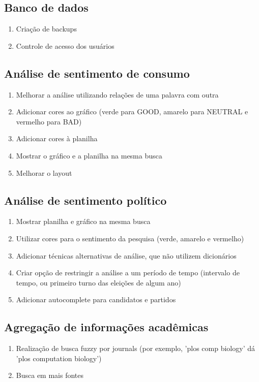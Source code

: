 \subsection{Banco de dados}
\begin{enumerate}
\item Criação de backups
\item Controle de acesso dos usuários
\end{enumerate}

\subsection{Análise de sentimento de consumo}
\begin{enumerate}
\item Melhorar a análise utilizando relações de uma palavra com outra
\item Adicionar cores ao gráfico (verde para GOOD, amarelo para NEUTRAL e vermelho para BAD)
\item Adicionar cores à planilha
\item Mostrar o gráfico e a planilha na mesma busca
\item Melhorar o layout
\end{enumerate}

\subsection{Análise de sentimento político}
\begin{enumerate}
\item Mostrar planilha e gráfico na mesma busca
\item Utilizar cores para o sentimento da pesquisa (verde, amarelo e vermelho)
\item Adicionar técnicas alternativas de análise, que não utilizem dicionários
\item Criar opção de restringir a análise a um período de tempo (intervalo de tempo, ou primeiro turno das eleições de algum ano)
\item Adicionar autocomplete para candidatos e partidos
\end{enumerate}

\subsection{Agregação de informações acadêmicas}
\begin{enumerate}
\item Realização de busca fuzzy por journals (por exemplo, 'plos comp biology' dá 'plos computation biology')
\item Busca em mais fontes
\end{enumerate}

